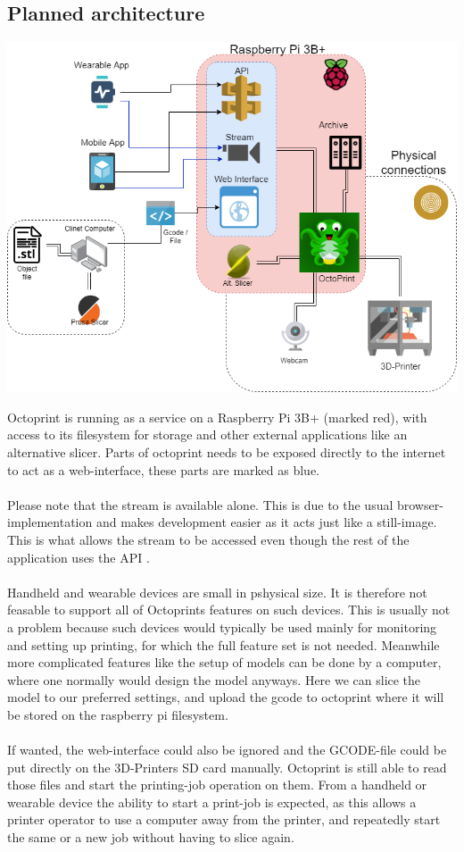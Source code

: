 \documentclass[a4paper, 12pt]{article}
\newcommand{\mysubsection}[1]{\subsection*{#1} \addcontentsline{toc}{subsection}{#1}}
\begin{document}
    \mysubsection{Planned architecture}
    \centerline{
        \includegraphics[scale=0.5]{figures/TizenPrint-architecture.png}
    }

    Octoprint is running as a service on a Raspberry Pi 3B+ (marked red), with access to its filesystem for storage and other
    external applications like an alternative slicer.
    Parts of octoprint needs to be exposed directly to the internet to act as a web-interface, these parts are marked as
    blue.
    \\\\
    Please note that the stream is available alone. This is due to the usual browser-implementation and makes development
    easier as it acts just like a still-image.
    This is what allows the stream to be accessed even though the rest of the application uses the API .
    \\\\
    Handheld and wearable devices are small in pshysical size. It is therefore not feasable to support all of Octoprints
    features on such devices.
    This is usually not a problem because such devices would typically be used mainly for monitoring and setting up printing,
    for which the full feature set is not needed.
    Meanwhile more complicated features like the setup of models can be done by a computer, where one normally would design 
    the model anyways.
    Here we can slice the model to our preferred settings, and upload the gcode to octoprint where it will be stored on
    the raspberry pi filesystem.
    \\\\
    If wanted, the web-interface could also be ignored and the GCODE-file could be put directly on the 3D-Printers SD card
    manually.
    Octoprint is still able to read those files and start the printing-job operation on them.
    From a handheld or wearable device the ability to start a print-job is expected, as this allows a printer operator
    to use a computer away from the printer, and repeatedly start the same or a new job without having to slice again.
\end{document}
